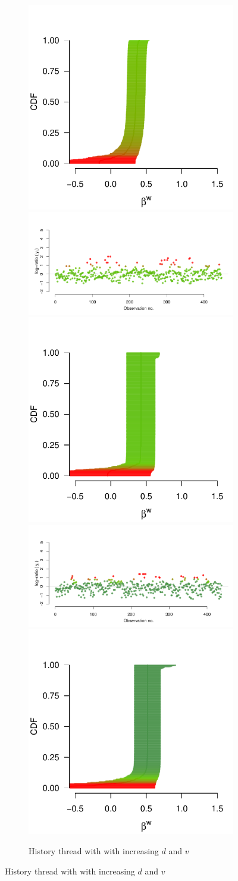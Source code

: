 \documentclass[9pt,a4paper,twocolumn,lineno]{article}
\begin{document}
\begin{figure}
\begin{subfigure}{.44\linewidth}
		\includegraphics[width=.28\linewidth]{beta_history_148_3}
		\includegraphics[width=.7\linewidth]{thread_history_403_9}	
		\includegraphics[width=.28\linewidth]{beta_history_403_9}
		\includegraphics[width=.7\linewidth]{thread_history_1097_9}	
		\includegraphics[width=.28\linewidth]{beta_history_1097_9}
		\caption{\footnotesize History thread with with increasing $d$ and $v$}
		\label{fig:supp hist}
	\end{subfigure}

\end{figure}
\end{document}
